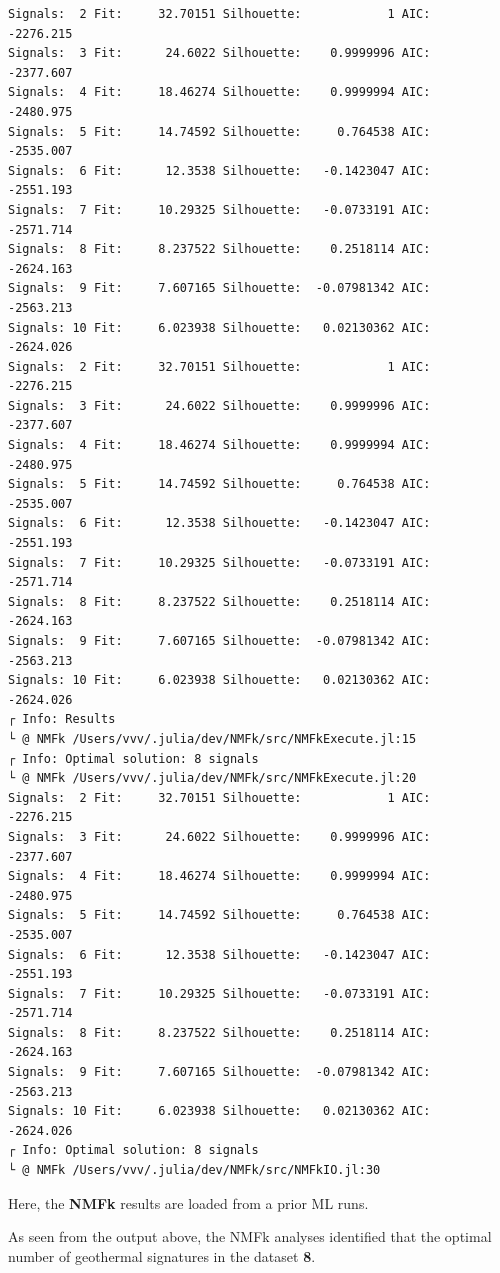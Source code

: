 \documentclass[11pt]{article}
\begin{document}
    \begin{Verbatim}[commandchars=\\\{\}]
Signals:  2 Fit:     32.70151 Silhouette:            1 AIC:    -2276.215
Signals:  3 Fit:      24.6022 Silhouette:    0.9999996 AIC:    -2377.607
Signals:  4 Fit:     18.46274 Silhouette:    0.9999994 AIC:    -2480.975
Signals:  5 Fit:     14.74592 Silhouette:     0.764538 AIC:    -2535.007
Signals:  6 Fit:      12.3538 Silhouette:   -0.1423047 AIC:    -2551.193
Signals:  7 Fit:     10.29325 Silhouette:   -0.0733191 AIC:    -2571.714
Signals:  8 Fit:     8.237522 Silhouette:    0.2518114 AIC:    -2624.163
Signals:  9 Fit:     7.607165 Silhouette:  -0.07981342 AIC:    -2563.213
Signals: 10 Fit:     6.023938 Silhouette:   0.02130362 AIC:    -2624.026
Signals:  2 Fit:     32.70151 Silhouette:            1 AIC:    -2276.215
Signals:  3 Fit:      24.6022 Silhouette:    0.9999996 AIC:    -2377.607
Signals:  4 Fit:     18.46274 Silhouette:    0.9999994 AIC:    -2480.975
Signals:  5 Fit:     14.74592 Silhouette:     0.764538 AIC:    -2535.007
Signals:  6 Fit:      12.3538 Silhouette:   -0.1423047 AIC:    -2551.193
Signals:  7 Fit:     10.29325 Silhouette:   -0.0733191 AIC:    -2571.714
Signals:  8 Fit:     8.237522 Silhouette:    0.2518114 AIC:    -2624.163
Signals:  9 Fit:     7.607165 Silhouette:  -0.07981342 AIC:    -2563.213
Signals: 10 Fit:     6.023938 Silhouette:   0.02130362 AIC:    -2624.026
┌ Info: Results
└ @ NMFk /Users/vvv/.julia/dev/NMFk/src/NMFkExecute.jl:15
┌ Info: Optimal solution: 8 signals
└ @ NMFk /Users/vvv/.julia/dev/NMFk/src/NMFkExecute.jl:20
Signals:  2 Fit:     32.70151 Silhouette:            1 AIC:    -2276.215
Signals:  3 Fit:      24.6022 Silhouette:    0.9999996 AIC:    -2377.607
Signals:  4 Fit:     18.46274 Silhouette:    0.9999994 AIC:    -2480.975
Signals:  5 Fit:     14.74592 Silhouette:     0.764538 AIC:    -2535.007
Signals:  6 Fit:      12.3538 Silhouette:   -0.1423047 AIC:    -2551.193
Signals:  7 Fit:     10.29325 Silhouette:   -0.0733191 AIC:    -2571.714
Signals:  8 Fit:     8.237522 Silhouette:    0.2518114 AIC:    -2624.163
Signals:  9 Fit:     7.607165 Silhouette:  -0.07981342 AIC:    -2563.213
Signals: 10 Fit:     6.023938 Silhouette:   0.02130362 AIC:    -2624.026
┌ Info: Optimal solution: 8 signals
└ @ NMFk /Users/vvv/.julia/dev/NMFk/src/NMFkIO.jl:30
    \end{Verbatim}

    Here, the \textbf{NMFk} results are loaded from a prior ML runs.

As seen from the output above, the NMFk analyses identified that the
optimal number of geothermal signatures in the dataset \textbf{8}.
\end{document}
